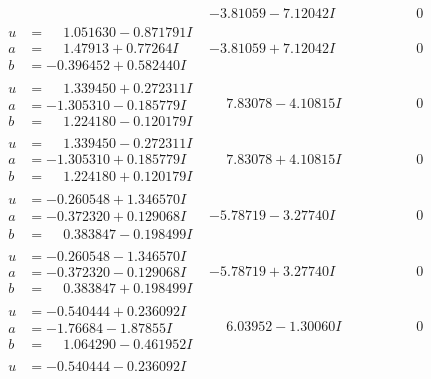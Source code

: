 \documentclass[1p]{elsarticle_modified}
\theoremstyle{definition}
\begin{document}
$$\begin{array}{c|c|c}
 & -3.81059 - 7.12042 I & \phantom{-0.000000 } 0 \\ \hline\begin{aligned}
u &= \phantom{-}1.051630 - 0.871791 I \\
a &= \phantom{-}1.47913 + 0.77264 I \\
b &= -0.396452 + 0.582440 I\end{aligned}
 & -3.81059 + 7.12042 I & \phantom{-0.000000 } 0 \\ \hline\begin{aligned}
u &= \phantom{-}1.339450 + 0.272311 I \\
a &= -1.305310 - 0.185779 I \\
b &= \phantom{-}1.224180 - 0.120179 I\end{aligned}
 & \phantom{-}7.83078 - 4.10815 I & \phantom{-0.000000 } 0 \\ \hline\begin{aligned}
u &= \phantom{-}1.339450 - 0.272311 I \\
a &= -1.305310 + 0.185779 I \\
b &= \phantom{-}1.224180 + 0.120179 I\end{aligned}
 & \phantom{-}7.83078 + 4.10815 I & \phantom{-0.000000 } 0 \\ \hline\begin{aligned}
u &= -0.260548 + 1.346570 I \\
a &= -0.372320 + 0.129068 I \\
b &= \phantom{-}0.383847 - 0.198499 I\end{aligned}
 & -5.78719 - 3.27740 I & \phantom{-0.000000 } 0 \\ \hline\begin{aligned}
u &= -0.260548 - 1.346570 I \\
a &= -0.372320 - 0.129068 I \\
b &= \phantom{-}0.383847 + 0.198499 I\end{aligned}
 & -5.78719 + 3.27740 I & \phantom{-0.000000 } 0 \\ \hline\begin{aligned}
u &= -0.540444 + 0.236092 I \\
a &= -1.76684 - 1.87855 I \\
b &= \phantom{-}1.064290 - 0.461952 I\end{aligned}
 & \phantom{-}6.03952 - 1.30060 I & \phantom{-0.000000 } 0 \\ \hline\begin{aligned}
u &= -0.540444 - 0.236092 I \\

\end{aligned}
\end{array}$$
\end{document}
